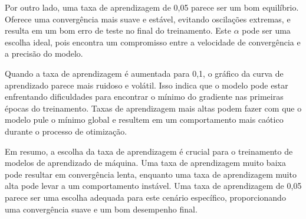 Por outro lado, uma taxa de aprendizagem de 0,05 parece ser um bom equilíbrio. 
Oferece uma convergência mais suave e estável, evitando oscilações extremas, e 
resulta em um bom erro de teste no final do treinamento. Este $\alpha$ pode ser 
uma escolha ideal, pois encontra um compromisso entre a velocidade de 
convergência e a precisão do modelo.

Quando a taxa de aprendizagem é aumentada para 0,1, o gráfico da curva de 
aprendizado parece mais ruidoso e volátil. Isso indica que o modelo pode estar 
enfrentando dificuldades 
para encontrar o mínimo do gradiente nas primeiras épocas do treinamento. Taxas 
de aprendizagem mais altas podem fazer com que o modelo pule o mínimo global e 
resultem em um comportamento mais caótico durante o processo de otimização.

Em resumo, a escolha da taxa de aprendizagem é crucial para o treinamento de 
modelos de aprendizado de máquina. Uma taxa de aprendizagem muito baixa pode 
resultar em convergência lenta, enquanto uma taxa de aprendizagem muito alta 
pode levar a um comportamento instável. Uma taxa de aprendizagem de 0,05 parece 
ser uma escolha adequada para este cenário específico, proporcionando uma 
convergência suave e um bom desempenho final.


